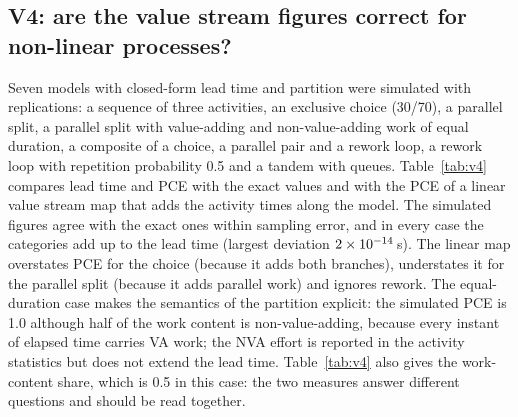 \documentclass[preprint,12pt,nonatbib]{elsarticle}
\begin{document}
\subsection{V4: are the value stream figures correct for non-linear processes?}
\label{sec:v4}
Seven models with closed-form lead time and partition were simulated with \VfourReps{} replications: a sequence of three activities, an exclusive choice (30/70), a parallel split, a parallel split with value-adding and non-value-adding work of equal duration, a composite of a choice, a parallel pair and a rework loop, a rework loop with repetition probability 0.5 and a tandem with queues. Table~\ref{tab:v4} compares lead time and PCE with the exact values and with the PCE of a linear value stream map that adds the activity times along the model. The simulated figures agree with the exact ones within sampling error, and in every case the categories add up to the lead time (largest deviation $2\times10^{-14}$\,s). The linear map overstates PCE for the choice (because it adds both branches), understates it for the parallel split (because it adds parallel work) and ignores rework. The equal-duration case makes the semantics of the partition explicit: the simulated PCE is 1.0 although half of the work content is non-value-adding, because every instant of elapsed time carries VA work; the NVA effort is reported in the activity statistics but does not extend the lead time. Table~\ref{tab:v4} also gives the work-content share, which is 0.5 in this case: the two measures answer different questions and should be read together.

\begin{table}[t]
\centering\small
\caption{V4: lead time (s), PCE, rework time (s) and VA share of executed work: exact, simulated and from a linear value stream map.}
\label{tab:v4}
\resizebox{\linewidth}{!}{}
\end{table}
\end{document}
